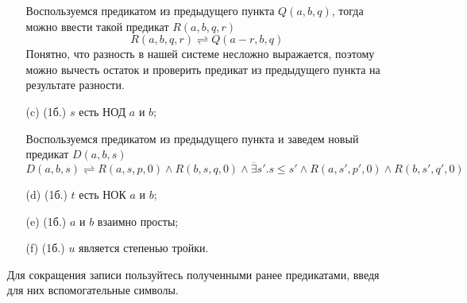 \begin{enumerate}
\begin{itemize}
        \begin{solution}
            Воспользуемся предикатом из предыдущего пункта $Q(a,b,q)$, тогда можно ввести такой предикат $R(a,b,q,r)$
            \begin{equation}
                R(a,b,q,r) \rightleftharpoons Q(a - r,b,q)
            \end{equation}
            Понятно, что разность в нашей системе несложно выражается, поэтому можно вычесть остаток и проверить предикат из предыдущего пункта на результате разности.
        \end{solution}
        \item[(c)] (1б.) $s$ есть НОД $a$ и $b$;
        \begin{solution}
            Воспользуемся предикатом из предыдущего пункта и заведем новый предикат $D(a,b,s)$
            \begin{equation}
                D(a,b,s) \rightleftharpoons R(a,s,p,0) \land R(b,s,q,0) \land \overline{\exists} s'. s \leq s' \land R(a,s',p',0) \land R(b,s',q',0)
            \end{equation}
        \end{solution}
        \item[(d)] (1б.) $t$ есть НОК $a$ и $b$;
        \item[(e)] (1б.) $a$ и $b$ взаимно просты;
        \item[(f)] (1б.) $u$ является степенью тройки.
    \end{itemize}
    Для сокращения записи пользуйтесь полученными ранее предикатами, введя для них вспомогательные символы.
    
\end{enumerate}
\clearpage
